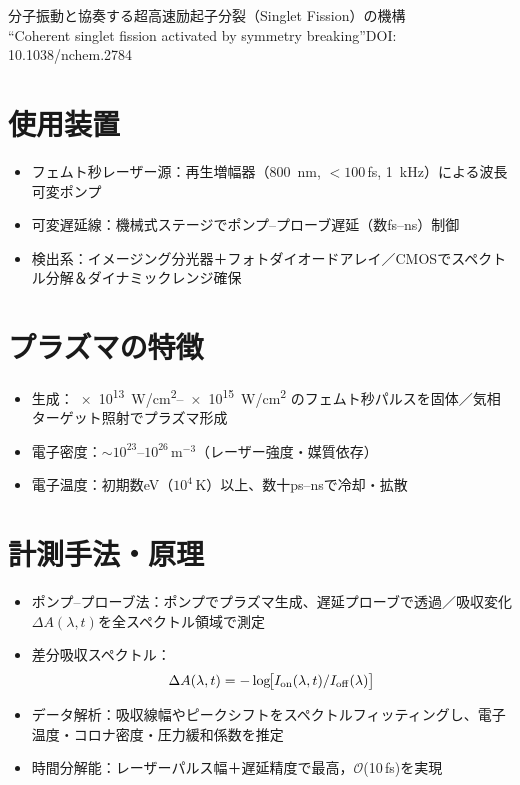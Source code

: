 \documentclass[a4paper,10pt]{article}
\begin{document}
\begin{center}
  {\LARGE 分子振動と協奏する超高速励起子分裂（Singlet Fission）の機構}\\
  “Coherent singlet fission activated by symmetry breaking”DOI: 10.1038/nchem.2784
\end{center}


\section*{使用装置}
\begin{itemize}
  \item フェムト秒レーザー源：再生増幅器（\SI{800}{nm}, $<100$\,fs, \SI{1}{kHz}）による波長可変ポンプ
  \item 可変遅延線：機械式ステージでポンプ–プローブ遅延（数fs–ns）制御
  \item 検出系：イメージング分光器＋フォトダイオードアレイ／CMOSでスペクトル分解＆ダイナミックレンジ確保
\end{itemize}

\section*{プラズマの特徴}
\begin{itemize}
  \item 生成：\SIrange{e13}{e15}{W/cm^2} のフェムト秒パルスを固体／気相ターゲット照射でプラズマ形成
  \item 電子密度：$\sim10^{23}$–$10^{26}\,\mathrm{m^{-3}}$（レーザー強度・媒質依存）
  \item 電子温度：初期数eV（$10^4$\,K）以上、数十ps–nsで冷却・拡散
\end{itemize}

\section*{計測手法・原理}
\begin{itemize}
  \item ポンプ–プローブ法：ポンプでプラズマ生成、遅延プローブで透過／吸収変化$\Delta A(\lambda,t)$を全スペクトル領域で測定
  \item 差分吸収スペクトル：
    \[
      \Delta A(\lambda,t)
      = -\log\!\bigl[I_{\rm on}(\lambda,t)/I_{\rm off}(\lambda)\bigr]
    \]
  \item データ解析：吸収線幅やピークシフトをスペクトルフィッティングし、電子温度・コロナ密度・圧力緩和係数を推定
  \item 時間分解能：レーザーパルス幅＋遅延精度で最高，$\mathcal{O}$(10\,fs)を実現
\end{itemize}
\end{document}
